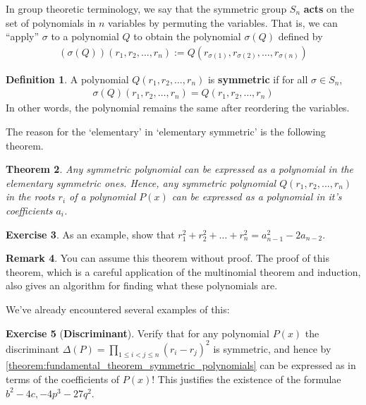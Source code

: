 \documentclass[reqno, 12pt, letter]{article}
\theoremstyle{plain}
\newtheorem{theorem}{Theorem}[section]
\theoremstyle{definition}
\newtheorem{definition}[theorem]{Definition}
\newtheorem{remark}[theorem]{Remark}
\newtheorem{exercise}[theorem]{Exercise}
\theoremstyle{remark}
\numberwithin{equation}{section}
\begin{document}
	In group theoretic terminology, we say that the symmetric group $ S_n$ \textbf{acts} on the set of polynomials in $ n$ variables by permuting the variables. 
	That is, we can ``apply'' $\sigma$ to a polynomial $Q$ to obtain the polynomial $\sigma(Q)$ defined by
		\begin{align*}
			(\sigma(Q))(r_1, r_2, \dots, r_n) := Q(r_{\sigma(1)}, r_{\sigma(2)}, \dots, r_{\sigma(n)})
		\end{align*}
		\begin{definition}
			\label{definition:}
			A polynomial $Q(r_1, r_2, \dots, r_n)$ is {\bf symmetric} if for all $\sigma \in S_n $, 
	\begin{align*}
		\sigma(Q) (r_1, r_2, \dots, r_n)= Q(r_1, r_2, \dots, r_n)
	\end{align*}
	In other words, the polynomial remains the same after reordering the variables.
		\end{definition}
	The reason for the `elementary' in `elementary symmetric' is the following theorem.
	\begin{theorem}
		\label{theorem:fundamental_theorem_symmetric_polynomials}
		Any symmetric polynomial can be expressed as a polynomial in the elementary symmetric ones. 
		Hence, any symmetric polynomial $ Q(r_1, r_2, \dots, r_n)$ in the roots $ r_i$ of a polynomial $ P(x)$ can be expressed as a polynomial in it's coefficients $ a_i$.
	\end{theorem}
	\begin{exercise}
		As an example, show that $ r_1^2 + r_2^2 + \dots + r_n^2  = a_{n-1}^2 - 2 a_{n-2}$.
	\end{exercise}
	\begin{remark}
		You can assume this theorem without proof. The proof of this theorem, which is a careful application of the multinomial theorem and induction, also gives an algorithm for finding what these polynomials are.
	\end{remark}
	
	We've already encountered several examples of this:
	\begin{exercise}[\textbf{Discriminant}]
		Verify that for any polynomial $ P(x)$ the discriminant $\Delta(P) = \prod_{1 \leq i < j \leq n} (r_i - r_j)^2$ is symmetric, and hence by \autoref{theorem:fundamental_theorem_symmetric_polynomials} can be expressed as in terms of the coefficients of $ P(x)$! This justifies the existence of the formulae $ b^2 - 4c, -4p^3 - 27q^2$.
	\end{exercise}
	
\end{document}
